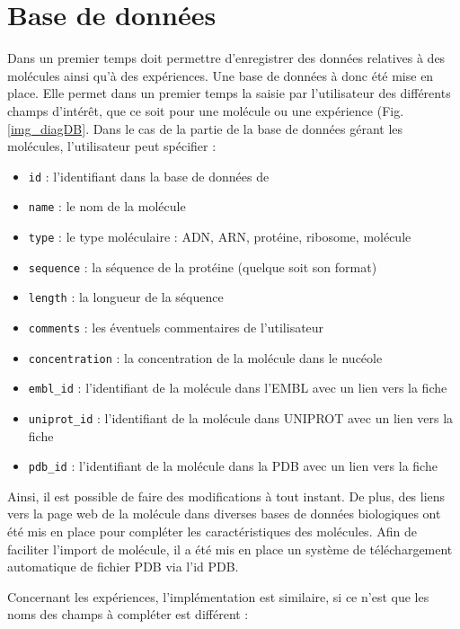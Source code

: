 \section{Base de données}

Dans un premier temps \NQ doit permettre d'enregistrer des données
relatives à des molécules ainsi qu'à des expériences. Une base de
données à donc été mise en place. Elle permet dans un premier temps la
saisie par l'utilisateur des différents champs d'intérêt, que ce soit
pour une molécule ou une expérience (Fig. \ref{img_diagDB}. Dans le
cas de la partie de la base de données gérant les molécules,
l'utilisateur peut spécifier :

\begin{itemize}
	\item \texttt{id} : l'identifiant dans la base de données de \NQ
	\item \texttt{name} : le nom de la molécule
	\item \texttt{type} : le type moléculaire : ADN, ARN, protéine, ribosome, molécule
	\item \texttt{sequence} : la séquence de la protéine (quelque soit son format)
	\item \texttt{length} : la longueur de la séquence
	\item \texttt{comments} : les éventuels commentaires de l'utilisateur
	\item \texttt{concentration} : la concentration de la molécule dans le nucéole
	\item \texttt{embl\_id} : l'identifiant de la molécule dans l'EMBL avec un lien vers la fiche
	\item \texttt{uniprot\_id} : l'identifiant de la molécule dans UNIPROT avec un lien vers la fiche
	\item \texttt{pdb\_id} : l'identifiant de la molécule dans la PDB avec un lien vers la fiche
\end{itemize}

Ainsi, il est possible de faire des modifications à tout instant. De
plus, des liens vers la page web de la molécule dans diverses bases de
données biologiques ont été mis en place pour compléter les
caractéristiques des molécules. Afin de faciliter l'import de
molécule, il a été mis en place un système de téléchargement
automatique de fichier PDB via l'id PDB.

Concernant les expériences, l'implémentation est similaire, si ce
n'est que les noms des champs à compléter est différent :


